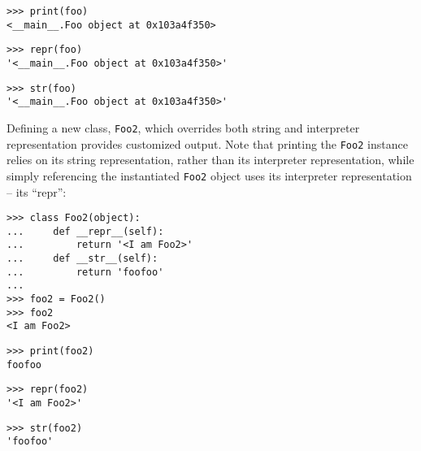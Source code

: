\begin{comment}
<abjad>
print(foo)
repr(foo)
str(foo)
</abjad>
\end{comment}

\begin{abjadbookoutput}
\begin{singlespacing}
\vspace{-0.5\baselineskip}
\begin{lstlisting}
>>> print(foo)
<__main__.Foo object at 0x103a4f350>
\end{lstlisting}
\begin{lstlisting}
>>> repr(foo)
'<__main__.Foo object at 0x103a4f350>'
\end{lstlisting}
\begin{lstlisting}
>>> str(foo)
'<__main__.Foo object at 0x103a4f350>'
\end{lstlisting}
\end{singlespacing}
\end{abjadbookoutput}

\noindent Defining a new class, \texttt{Foo2}, which overrides both string and
interpreter representation provides customized output. Note that printing the
\texttt{Foo2} instance relies on its string representation, rather than its
interpreter representation, while simply referencing the instantiated
\texttt{Foo2} object uses its interpreter representation -- its \enquote{repr}:

\begin{comment}
<abjad>
class Foo2(object):
    def __repr__(self):
        return '<I am Foo2>'
    def __str__(self):
        return 'foofoo'

foo2 = Foo2()
foo2
print(foo2)
repr(foo2)
str(foo2)
</abjad>
\end{comment}

\begin{abjadbookoutput}
\begin{singlespacing}
\vspace{-0.5\baselineskip}
\begin{lstlisting}
>>> class Foo2(object):
...     def __repr__(self):
...         return '<I am Foo2>'
...     def __str__(self):
...         return 'foofoo'
...
>>> foo2 = Foo2()
>>> foo2
<I am Foo2>
\end{lstlisting}
\begin{lstlisting}
>>> print(foo2)
foofoo
\end{lstlisting}
\begin{lstlisting}
>>> repr(foo2)
'<I am Foo2>'
\end{lstlisting}
\begin{lstlisting}
>>> str(foo2)
'foofoo'
\end{lstlisting}
\end{singlespacing}
\end{abjadbookoutput}

